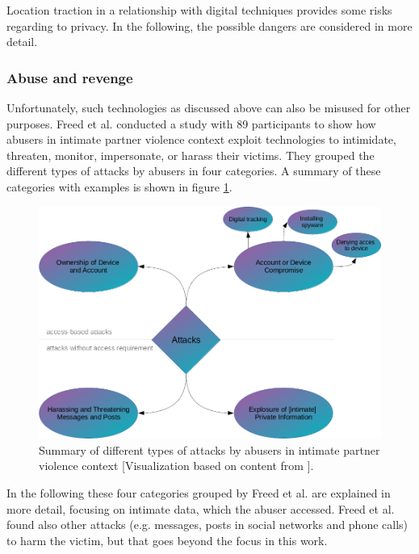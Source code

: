 
Location traction in a relationship with digital techniques provides some risks regarding to privacy. In the following, the possible dangers are considered in more detail.

\subsubsection{Abuse and revenge}
Unfortunately, such technologies as discussed above can also be misused for other purposes. Freed et al. \cite{freed2018stalker} conducted a study with 89 participants to show how abusers in intimate partner violence context exploit technologies to intimidate, threaten, monitor, impersonate, or harass their victims.
They grouped the different types of attacks by abusers in four categories. A summary of these categories with examples is shown in figure \ref{fig:abusing_categories}.

\begin{figure}[htb]
	\centering
	\includegraphics[width=\linewidth]{img/abusing_categories.png}
	\caption{Summary of different types of attacks by abusers in intimate partner violence context [Visualization based on content from \cite{freed2018stalker}].}
	\label{fig:abusing_categories}
\end{figure}
In the following these four categories grouped by Freed et al. \cite{freed2018stalker} are explained in more detail, focusing on intimate data, which the abuser accessed. Freed et al. found also other attacks (e.g. messages, posts in social networks and phone calls) to harm the victim, but that goes beyond the focus in this work.

